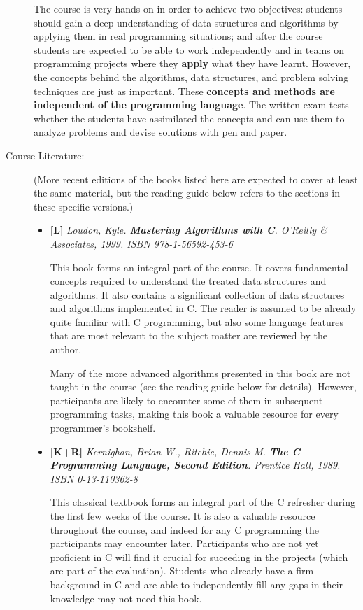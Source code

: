 \documentclass[a4paper]{article}
\newcommand{\refl}{\textbf{[L]}\xspace}
\newcommand{\refkr}{\textbf{[K+R]}\xspace}
\begin{document}
\begin{description}
  The course is very hands-on in order to achieve two objectives:
  students should gain a deep understanding of data structures and algorithms by applying them in real programming situations;
  and after the course students are expected to be able to work independently and in teams on programming projects where they \textbf{apply} what they have learnt.
  However, the concepts behind the algorithms, data structures, and problem solving techniques are just as important.
  These \textbf{concepts and methods are independent of the programming language}.
  The written exam tests whether the students have assimilated the concepts and can use them to analyze problems and devise solutions with pen and paper.
  
\item[Course Literature:]
  (More recent editions of the books listed here are expected to cover at least the same material, but the reading guide below refers to the sections in these specific versions.)
  
  \begin{itemize}
    
  \item \refl
    \emph{
      Loudon, Kyle.
      \textbf{Mastering Algorithms with C}.
      O'Reilly \& Associates, 1999.
      ISBN 978-1-56592-453-6
    }
    
  This book forms an integral part of the course.
  It covers fundamental concepts required to understand the treated data structures and algorithms.
  It also contains a significant collection of data structures and algorithms implemented in C.
  The reader is assumed to be already quite familiar with C programming, but also some language features that are most relevant to the subject matter are reviewed by the author.
  
  Many of the more advanced algorithms presented in this book are not taught in the course (see the reading guide below for details).
  However, participants are likely to encounter some of them in subsequent programming tasks, making this book a valuable resource for every programmer's bookshelf.
  
  \item \refkr
    \emph{
      Kernighan, Brian W., Ritchie, Dennis M.
      \textbf{The C Programming Language, \emph{Second Edition}}.
      Prentice Hall, 1989.
      ISBN 0-13-110362-8
    }
    
    This classical textbook forms an integral part of the C refresher during the first few weeks of the course.
    It is also a valuable resource throughout the course, and indeed for any C programming the participants may encounter later.
    Participants who are not yet proficient in C will find it crucial for suceeding in the projects (which are part of the evaluation).
    Students who already have a firm background in C and are able to independently fill any gaps in their knowledge may not need this book.
    
  \end{itemize}
  
\end{description}
\end{document}
